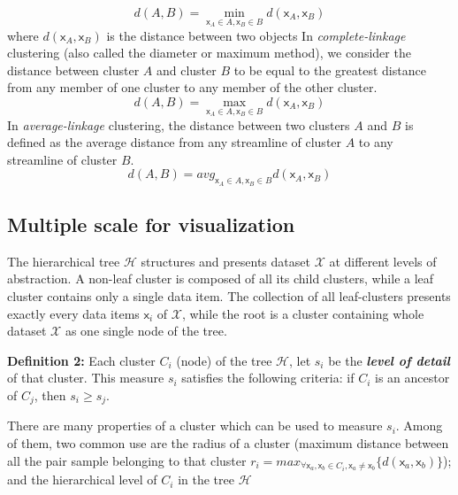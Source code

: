 \begin{equation}
\label{eq:distance_single_linkage}
d(A, B) = \min_{\mathsf{x}_A \in {A},\mathsf{x}_B \in {B}} d(\mathsf{x}_A,\mathsf{x}_B)
\end{equation}
where $d(\mathsf{x}_A,\mathsf{x}_B)$ is the distance between two objects
In \emph{complete-linkage} clustering (also called the diameter or maximum method), we consider the distance between cluster $A$ and cluster $B$ to be equal to the greatest distance from any member of one cluster to any member of the other cluster.
\begin{equation}
\label{eq:distance_complete_linkage}
d(A, B) = \max_{\mathsf{x}_A \in {A},\mathsf{x}_B \in {B}} d(\mathsf{x}_A,\mathsf{x}_B)
\end{equation}
In \emph{average-linkage} clustering, the distance between two clusters $A$ and $B$ is defined as the average distance from any streamline of cluster $A$ to any streamline of cluster $B$.
\begin{equation}
\label{eq:distance_average_linkage}
d(A, B) = avg_{\mathsf{x}_A \in {A},\mathsf{x}_B \in {B}} d(\mathsf{x}_A,\mathsf{x}_B)
\end{equation}

\subsection{Multiple scale for visualization}
\label{sec:multiscale}
The hierarchical tree $\mathcal{H}$ structures and presents dataset $\mathcal{X}$ at different levels of abstraction. A non-leaf cluster is composed of all its child clusters, while a leaf cluster contains only a single data item. The collection of all leaf-clusters presents exactly every data items $\mathsf{x}_i$ of $\mathcal{X}$, while the root is a cluster containing whole dataset $\mathcal{X}$ as one single node of the tree.

\textbf{Definition 2:} Each cluster $C_i$ (node) of the tree $\mathcal{H}$, let $s_i$ be the \textbf{\textit{level of detail}} of that cluster. This measure $s_i$ satisfies the following criteria: if $C_i$ is an ancestor of $C_j$, then $s_i \geq s_j$. 

There are many properties of a cluster which can be used to measure $s_i$. Among of them, two common use are the radius of a cluster (maximum distance between all the pair sample belonging to that cluster $r_i = max_{\forall \mathsf{x}_a, \mathsf{x}_b
 \in C_i, \mathsf{x}_a \neq \mathsf{x}_b} \{d(\mathsf{x}_a,\mathsf{x}_b)\}$); and the hierarchical level of $C_i$ in the tree $\mathcal{H}$ 

